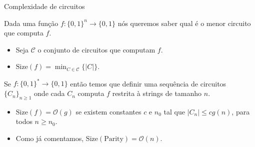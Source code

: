 \documentclass[landscape, 9pt]{beamer}
\newcommand{\binalph}{\{0, 1\}}
\newcommand{\Size}{\text{Size}}
\newcommand{\Parity}{\text{Parity}}
\begin{document}

\begin{frame} {Complexidade de circuitos}

Dada uma função $f: \binalph^{n} \to \binalph$ nós queremos saber qual é o menor circuito que computa $f$.

\begin{itemize}

	\item Seja $\mathscr{C}$ o conjunto de circuitos que computam $f$.
	
	\item $\Size(f) = \min_{C \in \mathscr{C}}\{ \lvert C \rvert \}$.

\end{itemize}

Se $f: \binalph^{*} \to \binalph$ então temos que definir uma sequência de circuitos $\{C_{n}\}_{n \geq 1}$ onde cada $C_{n}$ computa $f$ restrita à strings de tamanho $n$.

\begin{itemize}

	\item $\Size(f) = \mathcal{O}(g)$ se existem constantes $c$ e $n_{0}$ tal que $\lvert C_{n} \rvert \leq cg(n)$, para todos $n \geq n_{0}$.
	
	\item Como já comentamos, $\Size(\Parity) = \mathcal{O}(n)$.

\end{itemize}

\end{frame}

\end{document}
